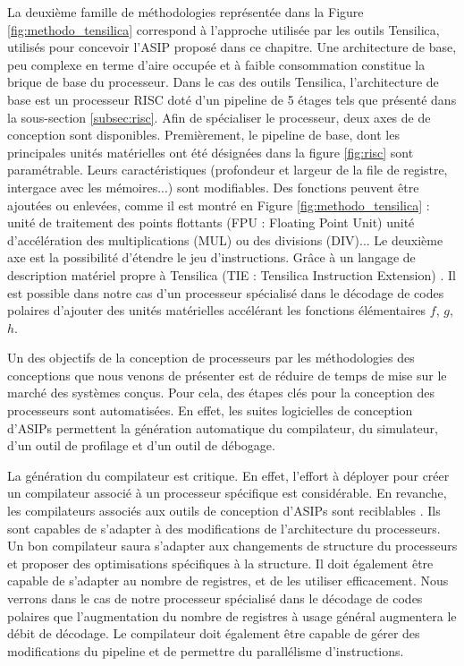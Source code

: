 La deuxième famille de méthodologies représentée dans la Figure \ref{fig:methodo_tensilica} correspond à l'approche utilisée par les outils Tensilica, utilisés pour concevoir l'ASIP proposé dans ce chapitre. Une architecture de base, peu complexe en terme d'aire occupée et à faible consommation constitue la brique de base du processeur. Dans le cas des outils Tensilica, l'architecture de base est un processeur RISC doté d'un pipeline de 5 étages tels que présenté dans la sous-section \ref{subsec:risc}. Afin de spécialiser le processeur, deux axes de de conception sont disponibles. Premièrement, le pipeline de base, dont les principales unités matérielles ont été désignées dans la figure \ref{fig:risc} sont paramétrable. Leurs caractéristiques (profondeur et largeur de la file de registre, intergace avec les mémoires...) sont modifiables. Des fonctions peuvent être ajoutées ou enlevées, comme il est montré en Figure \ref{fig:methodo_tensilica} : unité de traitement des points flottants (FPU : Floating Point Unit) unité d'accélération des multiplications (MUL) ou des divisions (DIV)... Le deuxième axe est la possibilité d'étendre le jeu d'instructions. Grâce à un langage de description matériel propre à Tensilica (TIE : Tensilica Instruction Extension) \cite{tie2017reference}. Il est possible dans notre cas d'un processeur spécialisé dans le décodage de codes polaires d'ajouter des unités matérielles accélérant les fonctions élémentaires $f$, $g$, $h$.

Un des objectifs de la conception de processeurs par les méthodologies des conceptions que nous venons de présenter est de réduire de temps de mise sur le marché des systèmes conçus. Pour cela, des étapes clés pour la conception des processeurs sont automatisées. En effet, les suites logicielles de conception d'ASIPs permettent la génération automatique du compilateur, du simulateur, d'un outil de profilage et d'un outil de débogage. 

La génération du compilateur est critique. En effet, l'effort à déployer pour créer un compilateur associé à un processeur spécifique est considérable. En revanche, les compilateurs associés aux outils de conception d'ASIPs sont \og reciblables \fg. Ils sont capables de s'adapter à des modifications de l'architecture du processeurs. Un bon compilateur saura s'adapter aux changements de structure du processeurs et proposer des optimisations spécifiques à la structure. Il doit également être capable de s'adapter au nombre de registres, et de les utiliser efficacement. Nous verrons dans le cas de notre processeur spécialisé dans le décodage de codes polaires que l'augmentation du nombre de registres à usage général augmentera le débit de décodage. Le compilateur doit également être capable de gérer des modifications du pipeline et de permettre du parallélisme d'instructions.

